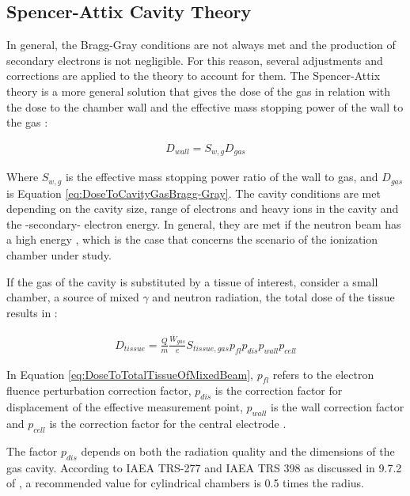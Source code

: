 \subsection{Spencer-Attix Cavity Theory}
In general, the Bragg-Gray conditions are not always met and the production of secondary electrons is not negligible. For this reason, several adjustments and corrections are applied to the theory to account for them. The Spencer-Attix theory is a more general solution that gives the dose of the gas in relation with the dose to the chamber wall and the effective mass stopping power of the wall to the gas \cite{aapm1980protocol}:

\begin{align}
\label{eq:DoseToWall}
    {D_{wall} = S_{w,g} D_{gas}}
\end{align}

Where $S_{w,g}$ is the effective mass stopping power ratio of the wall to gas, and $D_{gas}$ is Equation \ref{eq:DoseToCavityGasBragg-Gray}. The cavity conditions are met depending on the cavity size, range of electrons and heavy ions in the cavity and the -secondary- electron energy. In general, they are met if the neutron beam has a high energy \cite{RadiationOncologyInPhysicsHandbook}, which is the case that concerns the scenario of the ionization chamber under study.

If the gas of the cavity is substituted by a tissue of interest, consider a small chamber, a source of mixed $\gamma$ and neutron radiation, the total dose of the tissue results in \cite{RadiationOncologyInPhysicsHandbook}:

\begin{align}
\label{eq:DoseToTotalTissueOfMixedBeam}
    {D_{tissue} = \frac{Q}{m} \frac{\overline W_{gas}}{e} S_{tissue,gas} p_{fl} p_{dis} p_{wall} p_{cell}} 
\end{align}


In Equation \ref{eq:DoseToTotalTissueOfMixedBeam}, $p_{fl}$ refers to the electron fluence perturbation correction factor, $p_{dis}$ is the correction factor for displacement of the effective measurement point, $p_{wall}$ is the wall correction factor and $p_{cell}$ is the correction factor for the central electrode \cite{RadiationOncologyInPhysicsHandbook}.

The factor $p_{dis}$ depends on both the radiation quality and the dimensions of the gas cavity. According to IAEA TRS-277 and IAEA TRS 398 as discussed in 9.7.2 of \cite{RadiationOncologyInPhysicsHandbook}, a recommended value for cylindrical chambers is 0.5 times the radius. 

